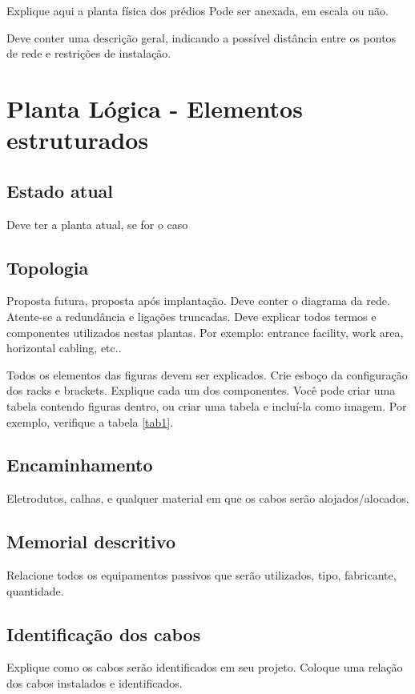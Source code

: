 \documentclass[	DIV=calc,%
							paper=a4,%
							fontsize=12pt,%
							onecolumn]{scrartcl}	 					%
\begin{document}
Explique aqui a planta física dos prédios
Pode ser anexada, em escala ou não.

Deve conter uma descrição geral, indicando a possível distância entre os pontos de rede e restrições de instalação.

\section{Planta Lógica - Elementos estruturados}

\subsection{Estado atual}
Deve ter a planta atual, se for o caso

\subsection{Topologia}
Proposta futura, proposta após implantação.
Deve conter o diagrama da rede. Atente-se a redundância  e ligações truncadas.
Deve explicar todos termos e componentes utilizados nestas plantas. Por exemplo: entrance facility, work area, horizontal cabling, etc..

Todos os elementos das figuras devem ser explicados. 
Crie esboço da configuração dos racks e brackets. Explique cada um dos componentes. Você pode criar uma tabela contendo figuras dentro, ou criar uma tabela e incluí-la como imagem. Por exemplo, verifique a tabela \ref{tab1}.



\subsection{Encaminhamento}
Eletrodutos, calhas, e qualquer material em que os cabos serão alojados/alocados.

\subsection{Memorial descritivo}

Relacione todos os equipamentos passivos que serão utilizados, tipo, fabricante, quantidade.

\subsection{Identificação dos cabos}
Explique como os cabos serão identificados em seu projeto. Coloque uma relação dos cabos instalados e identificados.
\end{document}
